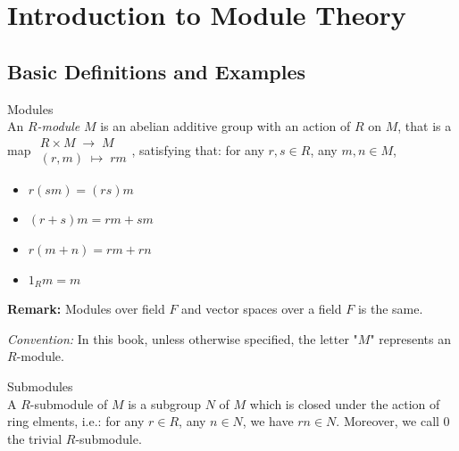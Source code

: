 \chapter{Introduction to Module Theory}

\section{Basic Definitions and Examples}

\begin{definition}{Modules}\\
An \textit{$R$-module} $M$ is an abelian additive group with an action of $R$ on $M$, that is a map $\substack{R \times M \;\to\; M\\
(r,m) \;\mapsto\; rm}$, satisfying that: for any $r,s \in R$, any $m,n \in M$,
\begin{itemize}
    \item $r(sm)=(rs)m$
    \item $(r+s)m =rm+sm$
    \item $r(m+n) =rm+rn$
    \item $1_R m=m$
\end{itemize}
\end{definition}

\noindent\textbf{Remark:} Modules over field $F$ and vector spaces over a field $F$ is the same.

\noindent\textit{Convention:} In this book, unless otherwise specified, the letter "$M$" represents an $R$-module.

\begin{definition}{Submodules}\\
A $R$-submodule of $M$ is a subgroup $N$ of $M$ which is closed under the action of ring elments, i.e.: for any $r\in R$, any $n \in N$, we have $rn \in N$. Moreover, we call $0$ the trivial $R$-submodule.
\end{definition}


